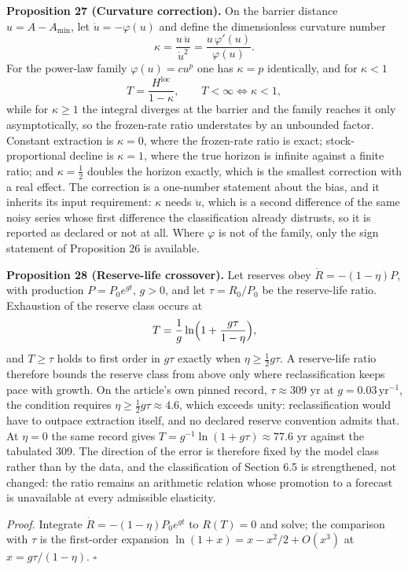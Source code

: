 \documentclass[11pt]{article}
\begin{document}
\textbf{Proposition 27 (Curvature correction).} On the barrier distance \(u=A-A_{\min}\), let
\(\dot u=-\varphi(u)\) and define the dimensionless curvature number
\[ \kappa=\frac{u\,\ddot u}{\dot u^{2}}=\frac{u\,\varphi'(u)}{\varphi(u)} . \]
For the power-law family \(\varphi(u)=cu^{p}\) one has \(\kappa=p\) identically, and for \(\kappa<1\)
\[ T=\frac{H^{\mathrm{loc}}}{1-\kappa}, \qquad T<\infty\iff\kappa<1, \]
while for \(\kappa\ge1\) the integral diverges at the barrier and the family reaches it only
asymptotically, so the frozen-rate ratio understates by an unbounded factor. Constant extraction is
\(\kappa=0\), where the frozen-rate ratio is exact; stock-proportional decline is \(\kappa=1\),
where the true horizon is infinite against a finite ratio; and \(\kappa=\tfrac12\) doubles the
horizon exactly, which is the smallest correction with a real effect. The correction is a one-number
statement about the bias, and it inherits its input requirement: \(\kappa\) needs \(\ddot u\), which
is a second difference of the same noisy series whose first difference the classification already
distrusts, so it is reported as declared or not at all. Where \(\varphi\) is not of the family, only
the sign statement of Proposition 26 is available.

\textbf{Proposition 28 (Reserve-life crossover).} Let reserves obey \(\dot R=-(1-\eta)P\), with
production \(P=P_0e^{gt}\), \(g>0\), and let \(\tau=R_0/\allowbreak{}P_0\) be the reserve-life ratio. Exhaustion of
the reserve class occurs at
\[ T=\frac1g\ln\Bigl(1+\frac{g\tau}{1-\eta}\Bigr), \]
and \(T\ge\tau\) holds to first order in \(g\tau\) exactly when \(\eta\ge\tfrac12g\tau\). A
reserve-life ratio therefore bounds the reserve class from above only where reclassification keeps
pace with growth. On the article's own pinned record, \(\tau\approx309\) yr at
\(g=0.03\,\mathrm{yr}^{-1}\), the condition requires \(\eta\ge\tfrac12g\tau\approx4.6\), which
exceeds unity: reclassification would have to outpace extraction itself, and no declared reserve
convention admits that. At \(\eta=0\) the same record gives \(T=g^{-1}\ln(1+g\tau)\approx77.6\) yr
against the tabulated 309. The direction of the error is therefore fixed by the model class rather
than by the data, and the classification of Section 6.5 is strengthened, not changed: the ratio
remains an arithmetic relation whose promotion to a forecast is unavailable at every admissible
elasticity.

\emph{Proof.} Integrate \(\dot R=-(1-\eta)P_0e^{gt}\) to \(R(T)=0\) and solve; the comparison with \(\tau\)
is the first-order expansion \(\ln(1+x)=x-x^2/\allowbreak{}2+O(x^3)\) at \(x=g\tau/(1-\eta)\). \ensuremath{\square}
\end{document}
